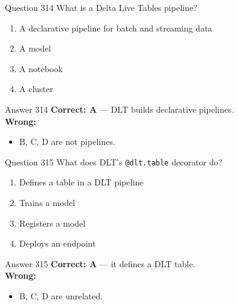 \documentclass[aspectratio=169,11pt]{beamer}
\begin{document}
	\begin{frame}{Question 314}
		What is a Delta Live Tables pipeline?
		\begin{enumerate}[label=\Alph*.]
			\item A declarative pipeline for batch and streaming data
			\item A model
			\item A notebook
			\item A cluster
		\end{enumerate}
	\end{frame}
	\begin{frame}{Answer 314}
		\textbf{Correct: A} --- DLT builds declarative pipelines.\\
		\vspace{0.5em}
		\textbf{Wrong:}
		\begin{itemize}
			\item B, C, D are not pipelines.
		\end{itemize}
	\end{frame}
	
	\begin{frame}{Question 315}
		What does DLT's \texttt{@dlt.table} decorator do?
		\begin{enumerate}[label=\Alph*.]
			\item Defines a table in a DLT pipeline
			\item Trains a model
			\item Registers a model
			\item Deploys an endpoint
		\end{enumerate}
	\end{frame}
	\begin{frame}{Answer 315}
		\textbf{Correct: A} --- it defines a DLT table.\\
		\vspace{0.5em}
		\textbf{Wrong:}
		\begin{itemize}
			\item B, C, D are unrelated.
		\end{itemize}
	\end{frame}
	
\end{document}

